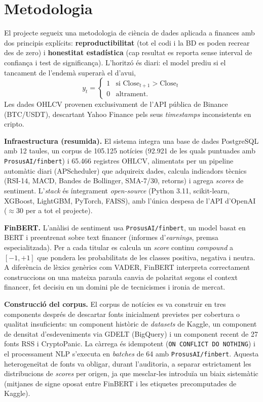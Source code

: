 \documentclass[10pt,twocolumn,a4paper]{article}
\begin{document}
\section{Metodologia}
El projecte segueix una metodologia de ciència de dades aplicada a finances amb
dos principis explícits: \textbf{reproductibilitat} (tot el codi i la BD es poden
recrear des de zero) i \textbf{honestitat estadística} (cap resultat es reporta
sense interval de confiança i test de significança). L'horitzó és diari: el model
prediu si el tancament de l'endemà superarà el d'avui,
\[
  y_t = \begin{cases} 1 & \text{si } \mathrm{Close}_{t+1} > \mathrm{Close}_t \\ 0 & \text{altrament.} \end{cases}
\]
Les dades OHLCV provenen exclusivament de l'API pública de Binance (BTC/USDT),
descartant Yahoo Finance pels seus \textit{timestamps} inconsistents en cripto.

\textbf{Infraestructura (resumida).} El sistema integra una base de dades
PostgreSQL amb 12 taules, un corpus de 105.125 notícies (92.921 de les quals
puntuades amb \texttt{ProsusAI/finbert}) i 65.466 registres OHLCV, alimentats per un pipeline
automàtic diari (APScheduler) que adquireix dades, calcula indicadors tècnics
(RSI-14, MACD, Bandes de Bollinger, SMA-7/30, retorns) i agrega \textit{scores} de
sentiment. L'\textit{stack} és íntegrament \textit{open-source} (Python 3.11,
scikit-learn, XGBoost, LightGBM, PyTorch, FAISS), amb l'única despesa de l'API
d'OpenAI ($\approx$30\texteuro{} per a tot el projecte).

\textbf{FinBERT.} L'anàlisi de sentiment usa \texttt{ProsusAI/finbert}, un model
basat en BERT i preentrenat sobre text financer (informes d'\textit{earnings},
premsa especialitzada). Per a cada titular es calcula un \textit{score} continu
\textit{compound} a $[-1,+1]$ que pondera les probabilitats de les classes positiva,
negativa i neutra. A diferència de lèxics genèrics com VADER, FinBERT interpreta
correctament construccions on una mateixa paraula canvia de polaritat segons el
context financer, fet decisiu en un domini ple de tecnicismes i ironia de mercat.

\textbf{Construcció del corpus.} El corpus de notícies es va construir en tres
components després de descartar fonts inicialment previstes per cobertura o qualitat
insuficients: un component històric de \textit{datasets} de Kaggle, un component de
densitat d'esdeveniments via GDELT (BigQuery) i un component recent de 27 fonts RSS
i CryptoPanic. La càrrega és idempotent (\texttt{ON CONFLICT DO NOTHING}) i el
processament NLP s'executa en \textit{batches} de 64 amb \texttt{ProsusAI/finbert}.
Aquesta heterogeneïtat de fonts va obligar, durant l'auditoria, a separar
estrictament les distribucions de \textit{scores} per origen, ja que mesclar-les
introduïa un biaix sistemàtic (mitjanes de signe oposat entre FinBERT i les
etiquetes precomputades de Kaggle).
\end{document}
